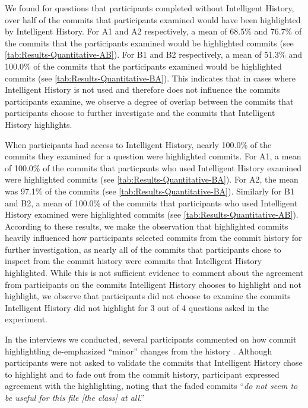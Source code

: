 We found for questions that participants completed without Intelligent History,
over half of the commits that participants examined would have been highlighted by Intelligent History.
For A1 and A2 respectively, a mean of 68.5\% and 76.7\% 
of the commits that the participants examined would be highlighted commits (see \autoref{tab:Results-Quantitative-AB}).
For B1 and B2 respectively, a mean of 51.3\% and 100.0\% 
of the commits that the participants examined would be highlighted commits (see \autoref{tab:Results-Quantitative-BA}).
This indicates that in cases where Intelligent History is not used and therefore does not influence the commits participants examine,
we observe a degree of overlap between the commits that participants choose to further investigate and the commits that Intelligent History highlights.

When participants had access to Intelligent History,
nearly 100.0\% of the commits they examined for a question were highlighted commits.
For A1, a mean of 100.0\% of the commits that particpants who used Intelligent History examined were highlighted commits (see \autoref{tab:Results-Quantitative-BA}).
For A2, the mean was 97.1\% of the commits (see \autoref{tab:Results-Quantitative-BA}).
Similarly for B1 and B2, a mean of 100.0\% of the commits that participants who used Intelligent History examined were highlighted commits (see \autoref{tab:Results-Quantitative-AB}).
According to these results, we make the observation that highlighted commits heavily 
influenced how participants selected commits from the commit history for further investigation, as
nearly all of the commits that participants chose to inspect from the commit history were commits that Intelligent History highlighted.
While this is not sufficient evidence to comment about the agreement from participants on the commits Intelligent History
chooses to highlight and not highlight,
we observe that participants did not choose to examine the commits Intelligent History did not highlight
for 3 out of 4 questions asked in the experiment.

In the interviews we conducted, 
several participants commented on how commit highlightling de-emphasized ``minor'' changes from the history .
Although participants were not asked to validate the commits that Intelligent History chose to highlight and to fade out from the commit history, 
participant  expressed agreement with the highlighting, 
noting that the faded commits ``\textit{do not seem to be useful for this file [the  class] at all}.''

